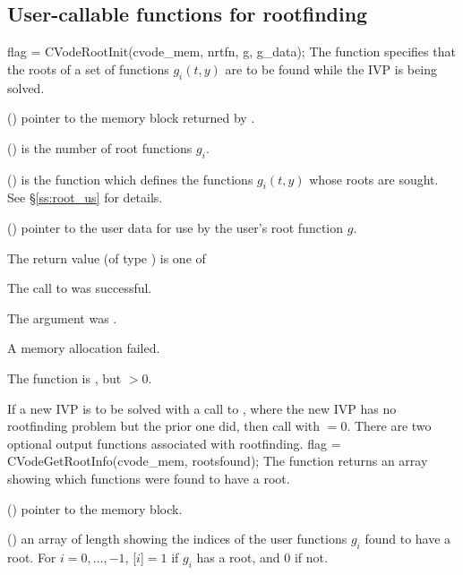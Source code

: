 \subsection{User-callable functions for rootfinding}\label{ss:root_uc}

{
  flag = CVodeRootInit(cvode\_mem, nrtfn, g, g\_data);
}
{
  The function  specifies that the roots of a set of
  functions $g_i(t,y)$ are to be found while the IVP is being solved.
}
{
  \begin{args}
  \item[cvode\_mem] ()
    pointer to the {\cvodes} memory block returned by .
  \item[nrtfn] ()
    is the number of root functions $g_i$.
  \item[g] ()
    is the {\C} function which defines the  functions $g_i(t,y)$
    whose roots are sought. See \S\ref{ss:root_us} for details.
  \item[g\_data] ()
    pointer to the user data for use by the user's root function $g$.
 \end{args}
}
{
  The return value  (of type ) is one of
  \begin{args}
  \item[CV\_SUCCESS]
    The call to  was successful.
  \item[CV\_MEM\_NULL]
    The  argument was .
  \item[CV\_MEM\_FAIL]
    A memory allocation failed.
  \item[CV\_RTFUNC\_NULL]
    The function  is , but $>0$.
  \end{args}
}
{
  If a new IVP is to be solved with a call to , where the new
  IVP has no rootfinding problem but the prior one did, then call
   with $=0$.
}
There are two optional output functions associated with rootfinding.
{
  flag = CVodeGetRootInfo(cvode\_mem, rootsfound);
}
{
  The function  returns an array showing which 
  functions were found to have a root.
}
{
  \begin{args}
  \item[cvode\_mem] ()
    pointer to the {\cvodes} memory block.
  \item[rootsfound] ()
    an  array of length  showing the indices
    of the user functions $g_i$ found to have a root.  For
    $i=0,\ldots,$$-1$, [$i$]$=1$ if $g_i$
    has a root, and $0$ if not.
  \end{args}
}

